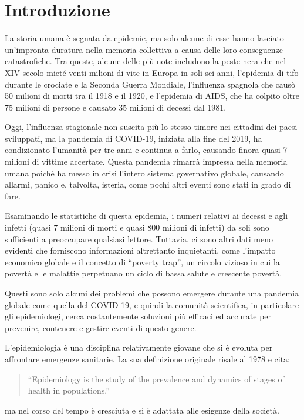 \section{Introduzione}
La storia umana è segnata da epidemie, ma solo alcune di esse hanno 
lasciato un'impronta duratura nella memoria collettiva a causa delle loro 
conseguenze catastrofiche. Tra queste, alcune delle più note includono la 
peste nera che nel XIV secolo mieté venti milioni di vite in Europa in 
soli sei anni, l'epidemia di tifo durante le crociate e la Seconda 
Guerra Mondiale, l'influenza spagnola che causò 50 milioni di morti tra 
il 1918 e il 1920, e l'epidemia di AIDS, che ha colpito oltre 75 milioni 
di persone e causato 35 milioni di decessi dal 1981.

Oggi, l'influenza stagionale non suscita più lo stesso timore nei 
cittadini dei paesi sviluppati, ma la pandemia di COVID-19, iniziata alla 
fine del 2019, ha condizionato l'umanità per tre anni e continua a farlo, 
causando finora quasi 7 milioni di vittime accertate. Questa pandemia 
rimarrà impressa nella memoria umana poiché ha messo in crisi l'intero 
sistema governativo globale, causando allarmi, panico e, talvolta, 
isteria, come pochi altri eventi sono stati in grado di fare.

Esaminando le statistiche di questa epidemia, i numeri relativi ai decessi 
e agli infetti (quasi 7 milioni di morti e quasi 800 milioni di infetti) 
da soli sono sufficienti a preoccupare qualsiasi lettore. Tuttavia, ci 
sono altri dati meno evidenti che forniscono informazioni altrettanto 
inquietanti, come l'impatto economico globale e il concetto di 
``poverty trap'', un circolo vizioso in cui la povertà e le malattie 
perpetuano un ciclo di bassa salute e crescente povertà.

Questi sono solo alcuni dei problemi che possono emergere durante una 
pandemia globale come quella del COVID-19, e quindi la comunità 
scientifica, in particolare gli epidemiologi, cerca costantemente 
soluzioni più efficaci ed accurate per prevenire, contenere e gestire 
eventi di questo genere.

L'epidemiologia è una disciplina relativamente giovane che si è evoluta 
per affrontare emergenze sanitarie. La sua definizione originale risale 
al 1978 \cite{Frerichs1978-cn} e cita: 
\begin{quote}
    	``Epidemiology is the study of the prevalence and dynamics of 
		stages of health in populations.''
\end{quote}
ma nel corso del tempo è cresciuta e si è adattata alle esigenze 
della società. 

